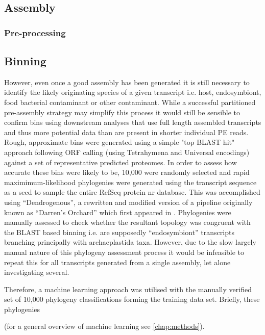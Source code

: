 \subsection{Assembly}

\subsubsection{Pre-processing}
\subsection{Binning}

However, even once a good assembly has been generated it is still necessary to identify the likely
originating species of a given transcript i.e. host, endosymbiont, food bacterial contaminant or other
contaminant.  While a successful partitioned pre-assembly strategy may simplify this process it would still
be sensible to confirm bins using downstream analyses that use full length assembled transcripts and thus
more potential data than are present in shorter individual PE reads.  Rough, approximate bins were
generated using a simple "top BLAST hit" approach following ORF calling (using Tetrahymena and Universal
encodings) against a set of representative predicted proteomes.  In order to assess how accurate these
bins were likely to be, 10,000 were randomly selected and rapid maximimum-likelihood phylogenies were
generated using the transcript sequence as a seed to sample the entire RefSeq protein nr database.
This was accomplished using ``Dendrogenous'', a rewritten and modified version of a pipeline originally known 
as ``Darren's Orchard'' which first appeared in \citep{Richards2009g}.  Phylogenies were manually assessed to check
whether the resultant topology was congruent with the BLAST based binning i.e. are supposedly ``endosymbiont''
transcripts branching principally with archaeplastida taxa.  
However, due to the slow largely manual nature of this phylogeny assessment process it would be infeasible
to repeat this for all transcripts generated from a single assembly, let alone investigating several. 


Therefore, a machine learning approach was utilised with the manually verified set of 10,000 phylogeny
classifications forming the training data set. Briefly, these phylogenies 



(for a general overview of machine learning see
\ref{chap:methods}).



